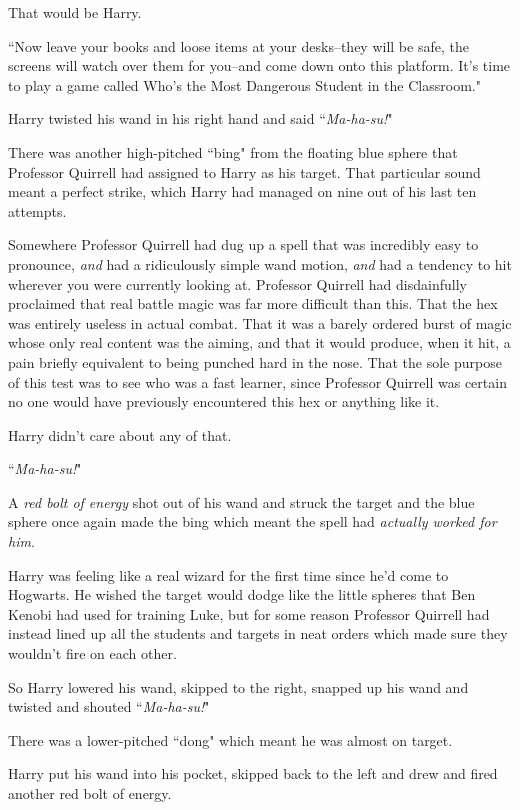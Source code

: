 That would be Harry.

``Now leave your books and loose items at your desks\---they will be safe, the screens will watch over them for you\---and come down onto this platform. It's time to play a game called Who's the Most Dangerous Student in the Classroom."

\later

Harry twisted his wand in his right hand and said ``\emph{Ma-ha-su!}"

There was another high-pitched ``bing" from the floating blue sphere that Professor Quirrell had assigned to Harry as his target. That particular sound meant a perfect strike, which Harry had managed on nine out of his last ten attempts.

Somewhere Professor Quirrell had dug up a spell that was incredibly easy to pronounce, \emph{and} had a ridiculously simple wand motion, \emph{and} had a tendency to hit wherever you were currently looking at. Professor Quirrell had disdainfully proclaimed that real battle magic was far more difficult than this. That the hex was entirely useless in actual combat. That it was a barely ordered burst of magic whose only real content was the aiming, and that it would produce, when it hit, a pain briefly equivalent to being punched hard in the nose. That the sole purpose of this test was to see who was a fast learner, since Professor Quirrell was certain no one would have previously encountered this hex or anything like it.

Harry didn't care about any of that.

``\emph{Ma-ha-su!}"

A \emph{red bolt of energy} shot out of his wand and struck the target and the blue sphere once again made the bing which meant the spell had \emph{actually worked for him}.

Harry was feeling like a real wizard for the first time since he'd come to Hogwarts. He wished the target would dodge like the little spheres that Ben Kenobi had used for training Luke, but for some reason Professor Quirrell had instead lined up all the students and targets in neat orders which made sure they wouldn't fire on each other.

So Harry lowered his wand, skipped to the right, snapped up his wand and twisted and shouted ``\emph{Ma-ha-su!}"

There was a lower-pitched ``dong" which meant he was almost on target.

Harry put his wand into his pocket, skipped back to the left and drew and fired another red bolt of energy.

